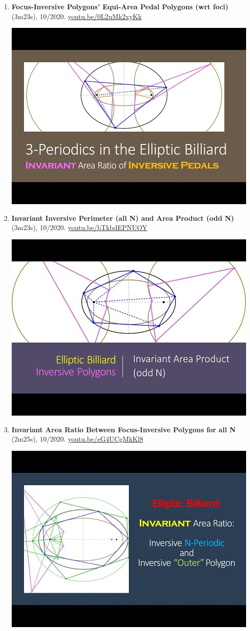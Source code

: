 \documentclass[12pt]{article}
\begin{document}
\begin{enumerate}[resume]
% 
\item \textbf{Focus-Inversive Polygons' Equi-Area Pedal Polygons (wrt foci)} (3m23s), 10/2020. \href{https://youtu.be/0L2uMk2xyKk}{\url{youtu.be/0L2uMk2xyKk}}
\begin{center}\includegraphics[width=.5\textwidth]{pics/0L2uMk2xyKk.jpg}\end{center}
% 
\item \textbf{Invariant Inversive Perimeter (all N) and Area Product (odd N)} (3m23s), 10/2020. \href{https://youtu.be/bTkbdEPNUOY}{\url{youtu.be/bTkbdEPNUOY}}
\begin{center}\includegraphics[width=.5\textwidth]{pics/bTkbdEPNUOY.jpg}\end{center}
% 
\item \textbf{Invariant Area Ratio Between Focus-Inversive Polygons for all N} (2m25s), 10/2020. \href{https://youtu.be/eG4UCgMkKl8}{\url{youtu.be/eG4UCgMkKl8}}
\begin{center}\includegraphics[width=.5\textwidth]{pics/eG4UCgMkKl8.jpg}\end{center}

\end{enumerate}
\end{document}
